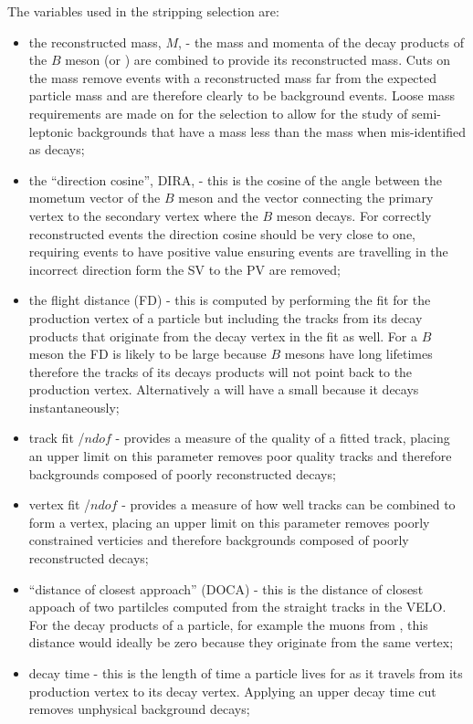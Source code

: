 The variables used in the stripping selection are:
\begin{itemize}
\item the reconstructed mass, $M$, - the mass and momenta of the decay products of the $B$ meson (or \jpsi) are combined to provide its reconstructed mass. Cuts on the mass remove events with a reconstructed mass far from the expected particle mass and are therefore clearly to be background events. Loose mass requirements are made on for the \bsmumu selection to allow for the study of semi-leptonic backgrounds that have a mass less than the \bs mass when mis-identified as \bsmumu decays;
\item the ``direction cosine'', DIRA, - this is the cosine of the angle between the mometum vector of the $B$ meson and the vector connecting the primary vertex to the secondary vertex where the $B$ meson decays. For correctly reconstructed events the direction cosine should be very close to one, requiring events to have positive value ensuring events are travelling in the incorrect direction form the SV to the PV are removed;
\item the flight distance (FD) \chisqd - this is computed by performing the fit for the production vertex of a particle but including the tracks from its decay products that originate from the decay vertex in the fit as well. For a $B$ meson the FD \chisqd is likely to be large because $B$ mesons have long lifetimes therefore the tracks of its decays products will not point back to the production vertex. Alternatively a \jpsi will have a small \chisqd because it decays instantaneously;
\item track fit \chisqd/$ndof$ - provides a measure of the quality of a fitted track, placing an upper limit on this parameter removes poor quality tracks and therefore backgrounds composed of poorly reconstructed decays;
\item vertex fit \chisqd/$ndof$ - provides a measure of how well tracks can be combined to form a vertex, placing an upper limit on this parameter removes poorly constrained verticies and therefore backgrounds composed of poorly reconstructed decays;
\item ``distance of closest approach'' (DOCA) - this is the distance of closest appoach of two partilcles computed from the straight tracks in the VELO. For the decay products of a particle, for example the muons from \bsmumu, this distance would ideally be zero because they originate from the same vertex;
\item decay time \lt - this is the length of time a particle lives for as it travels from its production vertex to its decay vertex. Applying an upper decay time cut removes unphysical background decays;

\end{itemize}
